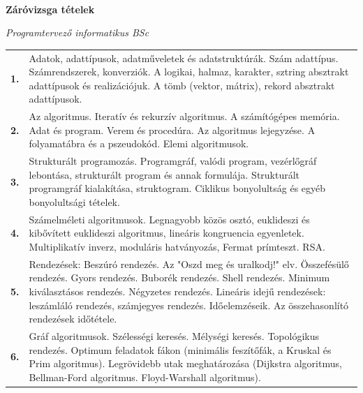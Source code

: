 \documentclass[a4paper,12pt]{article}
\begin{document}
\begin{center}
	
	\
	
	\vskip 1cm
	
	{\huge \textbf{Záróvizsga tételek}}
	
	\medskip

	{\large \textit{Programtervező informatikus BSc}}
\end{center}

\vskip 5mm

\renewcommand{\arraystretch}{1.2}

\begin{tabular}{|lp{16.5cm}|}

\hline

\textbf{1.} &
Adatok, adattípusok, adatműveletek és adatstruktúrák. Szám adattípus. Számrendszerek, konverziók. A logikai, halmaz, karakter, sztring absztrakt adattípusok és realizációjuk. A tömb (vektor, mátrix), rekord absztrakt adattípusok.
\\

\textbf{2.} &
Az algoritmus. Iteratív és rekurzív algoritmus. A számítógépes memória. Adat és program. Verem és procedúra. Az algoritmus lejegyzése. A folyamatábra és a pszeudokód. Elemi algoritmusok.
\\

\textbf{3.} &
Strukturált programozás. Programgráf, valódi program, vezérlőgráf lebontása, strukturált program és annak formulája. Strukturált programgráf kialakítása, struktogram. Ciklikus bonyolultság és egyéb bonyolultsági tételek.
\\

\hline

\textbf{4.} &
Számelméleti algoritmusok. Legnagyobb közös osztó, euklideszi és kibővített euklideszi algoritmus, lineáris kongruencia egyenletek. Multiplikatív inverz, moduláris hatványozás, Fermat prímteszt. RSA.
\\

\textbf{5.} &
Rendezések: Beszúró rendezés. Az "Oszd meg és uralkodj!" elv. Összefésülő rendezés. Gyors rendezés. Buborék rendezés. Shell rendezés. Minimum kiválasztásos rendezés. Négyzetes rendezés. Lineáris idejű rendezések: leszámláló rendezés, számjegyes rendezés. Időelemzéseik. Az összehasonlító rendezések időtétele.
\\

\textbf{6.} &
Gráf algoritmusok. Szélességi keresés. Mélységi keresés. Topológikus rendezés. Optimum feladatok fákon (minimális feszítőfák, a Kruskal és Prim algoritmus). Legrövidebb utak meghatározása (Dijkstra algoritmus, Bellman-Ford algoritmus. Floyd-Warshall algoritmus).
\\


\end{tabular}
\end{document}

